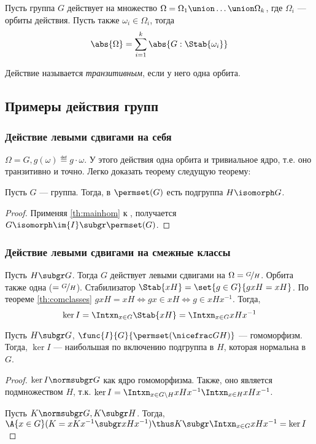 \begin{corollary}
  Пусть группа $G$ действует на множество $\Omega=\Omega_1\union\dots\union\Omega_k$, где $\Omega_i$ --- орбиты действия. Пусть также $\omega_i\in \Omega_i$, тогда
  \[\abs{\Omega}=\sum_{i=1}^k{\abs{G:\Stab{\omega_i}}}\]
\end{corollary}

\begin{definition}
  Действие называется \emph{транзитивным}, если у него одна орбита.
\end{definition}

\subsection{Примеры действия групп}
\subsubsection{Действие левыми сдвигами на себя}
$\Omega=G, g(\omega)\eqdef g\cdot\omega$. У этого действия одна орбита и тривиальное ядро, т.\:е. оно транзитивно и точно. Легко доказать теорему следущую теорему:
\begin{theorem}\label{th:cayley}
  Пусть $G$ --- группа. Тогда, в $\permset(G)$ есть подгруппа $H\isomorph G$.
\end{theorem}
\begin{proof}
  Применяя \ref{th:mainhom} к , получается $G\isomorph \im{I}\subgr \permset(G)$.
\end{proof}

\subsubsection{Действие левыми сдвигами на смежные классы}
Пусть $H\subgr G$. Тогда $G$ действует левыми сдвигами на $\Omega=\factorgr{G}{H}$. Орбита также одна ($=\factorgr{G}{H}$). Стабилизатор $\Stab{xH}=\set{g\in G}{gxH=xH}$. По теореме \ref{th:comclasses} $gxH=xH\iff gx\in xH \iff g\in xHx^{-1}$. Тогда,
\[\ker{I}=\Intxn_{x\in G}{\Stab{xH}}=\Intxn_{x\in G}{xHx^{-1}}\]
\begin{theorem}
  Пусть $H\subgr G$, $\func{I}{G}{\permset(\factorgr{G}{H})}$ --- гомоморфизм. Тогда, $\ker{I}$ --- наибольшая по включению подгруппа в $H$, которая нормальна в $G$.
\end{theorem}
\begin{proof}
  $\ker{I}\normsubgr G$ как ядро гомоморфизма. Также, оно является подмножеством $H$, т.\:к. $\ker{I}=\Intxn_{x\in G\setminus H}{xHx^{-1}}\Intxn_{x\in H}{xHx^{-1}}$.

  Пусть $K\normsubgr G, K\subgr H$. Тогда, $\A{x\in G}(K=xKx^{-1}\subgr xHx^{-1}) \thus K\subgr \Intxn_{x\in G}{xHx^{-1}}=\ker{I}$
\end{proof}

